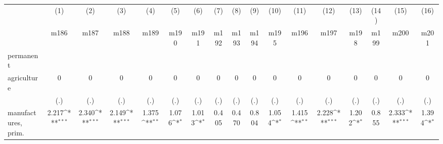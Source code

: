 {
\def\sym#1{\ifmmode^{#1}\else\(^{#1}\)\fi}
\begin{tabular}{l*{16}{c}}
\hline\hline
                    &\multicolumn{1}{c}{(1)}&\multicolumn{1}{c}{(2)}&\multicolumn{1}{c}{(3)}&\multicolumn{1}{c}{(4)}&\multicolumn{1}{c}{(5)}&\multicolumn{1}{c}{(6)}&\multicolumn{1}{c}{(7)}&\multicolumn{1}{c}{(8)}&\multicolumn{1}{c}{(9)}&\multicolumn{1}{c}{(10)}&\multicolumn{1}{c}{(11)}&\multicolumn{1}{c}{(12)}&\multicolumn{1}{c}{(13)}&\multicolumn{1}{c}{(14)}&\multicolumn{1}{c}{(15)}&\multicolumn{1}{c}{(16)}\\
                    &\multicolumn{1}{c}{m186}&\multicolumn{1}{c}{m187}&\multicolumn{1}{c}{m188}&\multicolumn{1}{c}{m189}&\multicolumn{1}{c}{m190}&\multicolumn{1}{c}{m191}&\multicolumn{1}{c}{m192}&\multicolumn{1}{c}{m193}&\multicolumn{1}{c}{m194}&\multicolumn{1}{c}{m195}&\multicolumn{1}{c}{m196}&\multicolumn{1}{c}{m197}&\multicolumn{1}{c}{m198}&\multicolumn{1}{c}{m199}&\multicolumn{1}{c}{m200}&\multicolumn{1}{c}{m201}\\
\hline
permanent           &                     &                     &                     &                     &                     &                     &                     &                     &                     &                     &                     &                     &                     &                     &                     &                     \\
agriculture         &           0         &           0         &           0         &           0         &           0         &           0         &           0         &           0         &           0         &           0         &           0         &           0         &           0         &           0         &           0         &           0         \\
                    &         (.)         &         (.)         &         (.)         &         (.)         &         (.)         &         (.)         &         (.)         &         (.)         &         (.)         &         (.)         &         (.)         &         (.)         &         (.)         &         (.)         &         (.)         &         (.)         \\
[1em]
manufactures, prim. &       2.217\sym{***}&       2.340\sym{***}&       2.149\sym{***}&       1.375\sym{**} &       1.076\sym{*}  &       1.013\sym{*}  &       0.405         &       0.470         &       0.804         &       1.054\sym{*}  &       1.415\sym{**} &       2.228\sym{***}&       1.202\sym{*}  &       0.855         &       2.333\sym{***}&       1.394\sym{*}  \\

\end{tabular}}
